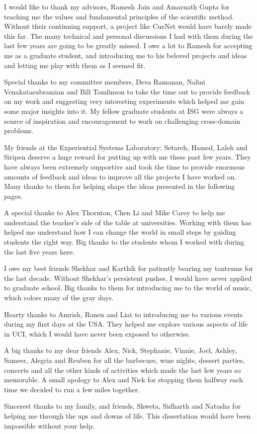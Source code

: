 \acknowledgments
{

I would like to thank my advisors, Ramesh Jain and Amarnath Gupta for teaching me the values and fundamental principles of the scientific method. Without their continuing support, a project like CueNet would have barely made this far. The many technical and personal discussions I had with them during the last few years are going to be greatly missed. I owe a lot to Ramesh for accepting me as a graduate student, and introducing me to his beloved projects and ideas and letting me play with them as I seemed fit.

Special thanks to my committee members, Deva Ramanan, Nalini Venakatasubramian and Bill Tomlinson to take the time out to provide feedback on my work and suggesting very interesting experiments which helped me gain some major insights into it. My fellow graduate students at ISG were always a source of inspiration and encouragement to work on challenging cross-domain problems. 

My friends at the Experiential Systems Laboratory: Setareh, Hamed, Laleh and Siripen deserve a huge reward for putting up with me these past few years. They have always been extremely supportive and took the time to provide enormous amounts of feedback and ideas to improve all the projects I have worked on. Many thanks to them for helping shape the ideas presented in the following pages.

A special thanks to Alex Thornton, Chen Li and Mike Carey to help me understand the teacher's side of the table at universities. Working with them has helped me understand how I can change the world in small steps by guiding students the right way. Big thanks to the students whom I worked with during the last five years here. 

I owe my best friends Shekhar and Karthik for patiently bearing my tantrums for the last decade. Without Shekhar’s persistent pushes, I would have never applied to graduate school. Big thanks to them for introducing me to the world of music, which colors many of the gray days.

Hearty thanks to Amrish, Ronen and Liat to introducing me to various events during my first days at the USA. They helped me explore various aspects of life in UCI, which I would have never been exposed to otherwise.

A big thanks to my dear friends Alex, Nick, Stephanie, Vinnie, Joel, Ashley, Sameer, Alegria and Reuben for all the barbecues, wine nights, dessert parties, concerts and all the other kinds of activities which made the last few years so memorable. A small apology to Alex and Nick for stopping them halfway each time we decided to run a few miles together.

Sincerest thanks to my family, and friends, Shweta, Sidharth and Natasha for helping me through the ups and downs of life. This dissertation would have been impossible without your help. 

}


